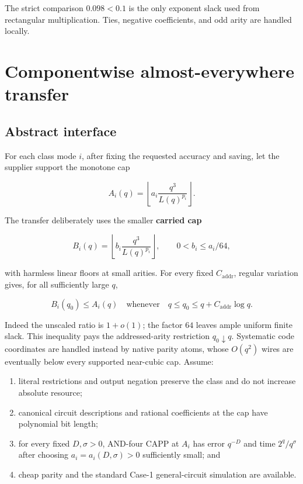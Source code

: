 \documentclass[11pt,letterpaper]{article}
\theoremstyle{definition}
\theoremstyle{remark}
\begin{document}
The strict comparison \(0.098<0.1\) is the only exponent slack used from
rectangular multiplication. Ties, negative coefficients, and odd arity
are handled locally.

\section{Componentwise almost-everywhere
transfer}\label{appendix-c-componentwise-almost-everywhere-transfer}

\subsection{Abstract interface}\label{c1-abstract-interface}

For each class mode \(i\), after fixing the requested accuracy and
saving, let the supplier support the monotone cap

\[
A_i(q)=\left\lfloor a_i\frac{q^3}{L(q)^{p_i}}\right\rfloor.
\]

The transfer deliberately uses the smaller \textbf{carried cap}

\[
B_i(q)=\left\lfloor b_i\frac{q^3}{L(q)^{p_i}}\right\rfloor,
\qquad
0<b_i\le a_i/64,
\tag{C.1.1}
\]

with harmless linear floors at small arities. For every fixed
\(C_{\mathrm{addr}}\), regular variation gives, for all sufficiently
large \(q\),

\[
B_i(q_0)\le A_i(q)
\quad\text{whenever}\quad
q\le q_0\le q+C_{\mathrm{addr}}\log q.
\tag{C.1.2}
\]

Indeed the unscaled ratio is \(1+o(1)\); the factor \(64\) leaves ample
uniform finite slack. This inequality pays the addressed-arity
restriction \(q_0\downarrow q\). Systematic code coordinates are handled
instead by native parity atoms, whose \(O(q^2)\) wires are eventually
below every supported near-cubic cap. Assume:

\begin{enumerate}
\def\labelenumi{\arabic{enumi}.}
\item
  literal restrictions and output negation preserve the class and do not
  increase absolute resource;
\item
  canonical circuit descriptions and rational coefficients at the cap
  have polynomial bit length;
\item
  for every fixed \(D,\sigma>0\), AND-four CAPP at \(A_i\) has error
  \(q^{-D}\) and time \(2^q/q^\sigma\) after choosing
  \(a_i=a_i(D,\sigma)>0\) sufficiently small; and
\item
  cheap parity and the standard Case-1 general-circuit simulation are
  available.
\end{enumerate}
\end{document}
